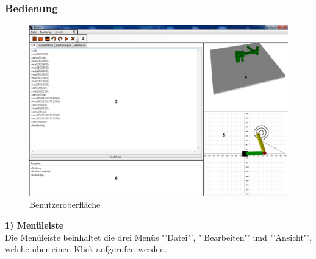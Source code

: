 \subsubsection{Bedienung}
\begin{figure}[H]
  \centering
  \begin{minipage}[t]{16 cm}
  	\centering
  	\includegraphics[width=16cm]{images/GUI} 
    \caption{Benutzeroberfläche}
  \end{minipage}
\end{figure}
\textbf{1) Menüleiste}\\
Die Menüleiste beinhaltet die drei Menüs "'Datei"', "'Bearbeiten"' und "'Ansicht"', welche über einen Klick aufgerufen werden.
